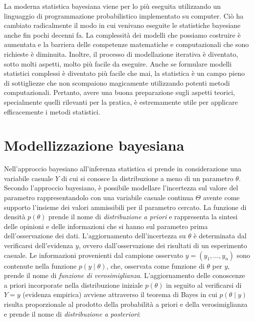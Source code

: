 \documentclass[
]{book}
\theoremstyle{definition}
\theoremstyle{definition}
\theoremstyle{definition}
\theoremstyle{definition}
\theoremstyle{remark}
\begin{document}
La moderna statistica bayesiana viene per lo più eseguita utilizzando un linguaggio di programmazione probabilistico implementato su computer. Ciò ha cambiato radicalmente il modo in cui venivano eseguite le statistiche bayesiane anche fin pochi decenni fa. La complessità dei modelli che possiamo costruire è aumentata e la barriera delle competenze matematiche e computazionali che sono richieste è diminuita. Inoltre, il processo di modellazione iterativa è diventato, sotto molti aspetti, molto più facile da eseguire. Anche se formulare modelli statistici complessi è diventato più facile che mai, la statistica è un campo pieno di sottigliezze che non scompaiono magicamente utilizzando potenti metodi computazionali. Pertanto, avere una buona preparazione sugli aspetti teorici, specialmente quelli rilevanti per la pratica, è estremamente utile per applicare efficacemente i metodi statistici.

\hypertarget{modellizzazione-bayesiana}{%
\section{Modellizzazione bayesiana}\label{modellizzazione-bayesiana}}

Nell'approccio bayesiano all'inferenza statistica si prende in considerazione una variabile casuale \(Y\) di cui si conosce la distribuzione a meno di un parametro \(\theta\). Secondo l'approccio bayesiano, è possibile modellare l'incertezza sul valore del parametro rappresentandolo con una variabile casuale continua \(\Theta\) avente come supporto l'insieme dei valori ammissibili per il parametro cercato. La funzione di densità \(p(\theta)\) prende il nome di \emph{distribuzione a priori} e rappresenta la sintesi delle opinioni e delle informazioni che si hanno sul parametro prima dell'osservazione dei dati. L'aggiornamento dell'incertezza su \(\theta\) è determinata dal verificarsi dell'evidenza \(y\), ovvero dall'osservazione dei risultati di un esperimento casuale. Le informazioni provenienti dal campione osservato \(y = (y_1, \dots, y_n)\) sono contenute nella funzione \(p(y \mid \theta)\), che, osservata come funzione di \(\theta\) per \(y\), prende il nome di \emph{funzione di verosimiglianza}. L'aggiornamento delle conoscenze a priori incorporate nella distribuzione iniziale \(p(\theta)\) in seguito al verificarsi di \(Y = y\) (evidenza empirica) avviene attraverso il teorema di Bayes in cui \(p(\theta \mid y)\) risulta proporzionale al prodotto della probabilità a priori e della verosimiglianza e prende il nome di \emph{distribuzione a posteriori}:
\end{document}
